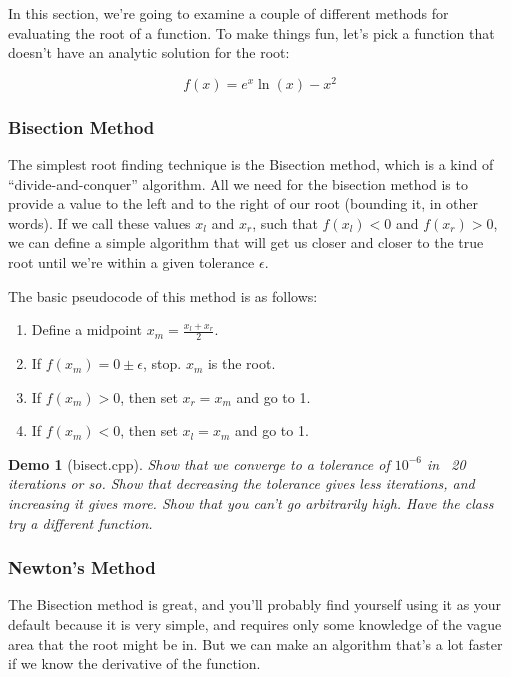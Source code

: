 \documentclass{article}
\theoremstyle{demo}
\newtheorem{demo}{Demo}[section]
\begin{document}
In this section, we're going to examine a couple of different methods for
evaluating the root of a function.  To make things fun, let's pick a function
that doesn't have an analytic solution for the root:

\begin{equation}
    f(x) = e^x\ln(x)-x^2
\end{equation}

\subsubsection{Bisection Method}
The simplest root finding technique is the Bisection method, which is a kind of
``divide-and-conquer'' algorithm.  All we need for the bisection method is to
provide a value to the left and to the right of our root (bounding it, in other
words).  If we call these values $x_l$ and $x_r$, such that $f(x_l) < 0$ and
$f(x_r) > 0$, we can define a simple algorithm that will get us closer and
closer to the true root until we're within a given tolerance $\epsilon$.

The basic pseudocode of this method is as follows:
\begin{enumerate}
    \item Define a midpoint $x_m = \frac{x_l + x_r}{2}$.
    \item If $f(x_m) = 0 \pm \epsilon$, stop.  $x_m$ is the root.
    \item If $f(x_m) > 0$, then set $x_r = x_m$ and go to 1.
    \item If $f(x_m) < 0$, then set $x_l = x_m$ and go to 1.
\end{enumerate}

\begin{demo}[bisect.cpp]
    Show that we converge to a tolerance of $10^{-6}$ in ~20 iterations or so.
    Show that decreasing the tolerance gives less iterations, and increasing it
    gives more.  Show that you can't go arbitrarily high.  Have the class try a
    different function.
\end{demo}
\subsubsection{Newton's Method}
The Bisection method is great, and you'll probably find yourself using it as
your default because it is very simple, and requires only some knowledge of the
vague area that the root might be in.  But we can make an algorithm that's a lot
faster if we know the derivative of the function.
\end{document}
